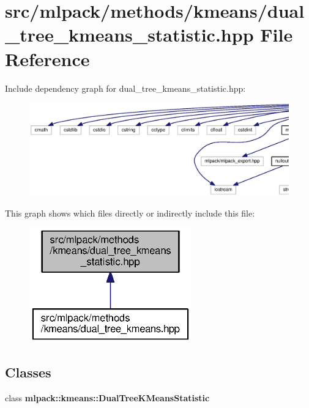 \section{src/mlpack/methods/kmeans/dual\+\_\+tree\+\_\+kmeans\+\_\+statistic.hpp File Reference}
\label{dual__tree__kmeans__statistic_8hpp}
Include dependency graph for dual\+\_\+tree\+\_\+kmeans\+\_\+statistic.\+hpp\+:
\nopagebreak
\begin{figure}[H]
\begin{center}
\leavevmode
\includegraphics[width=350pt]{dual__tree__kmeans__statistic_8hpp__incl}
\end{center}
\end{figure}
This graph shows which files directly or indirectly include this file\+:
\nopagebreak
\begin{figure}[H]
\begin{center}
\leavevmode
\includegraphics[width=199pt]{dual__tree__kmeans__statistic_8hpp__dep__incl}
\end{center}
\end{figure}
\subsection*{Classes}
\begin{DoxyCompactItemize}
\item 
class {\bf mlpack\+::kmeans\+::\+Dual\+Tree\+K\+Means\+Statistic}
\end{DoxyCompactItemize}
